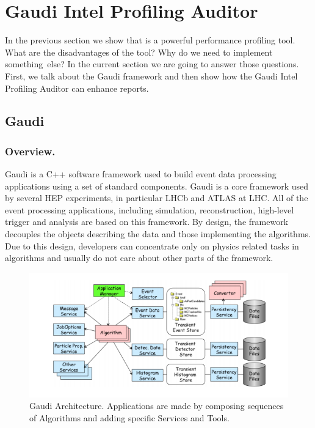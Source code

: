 \documentclass[a4paper]{jpconf}
\begin{document}
\section{Gaudi Intel Profiling Auditor}

In the previous section we show that \iamp is a powerful performance profiling tool. What are the disadvantages of the tool? 
Why do we need to implement something~else? In the current section we are going to answer those questions. 
First, we talk about the Gaudi framework and then show how the Gaudi Intel Profiling Auditor can enhance \amp reports.

\subsection{Gaudi}

\subsubsection{Overview.}

Gaudi is a C++ software framework used to build event data processing applications using a set of standard components.  
Gaudi is a core framework used by several HEP experiments, in particular LHCb and ATLAS at LHC. 
All of the event processing applications, including simulation, reconstruction, high-level trigger and analysis 
are based on this framework. By design, the framework decouples the objects  describing the data and those 
implementing the algorithms. Due to this design,  developers can concentrate only on  physics related tasks 
in algorithms and usually do not care about other parts of the framework. 

\begin{figure}[H]
\begin{minipage}{\textwidth}
\includegraphics[width=\textwidth]{figs/fig07.png}
\caption{\label{fig07}Gaudi Architecture. Applications are made by composing sequences of Algorithms and adding 
specific Services and Tools.}
\end{minipage}
\end{figure}
\end{document}
